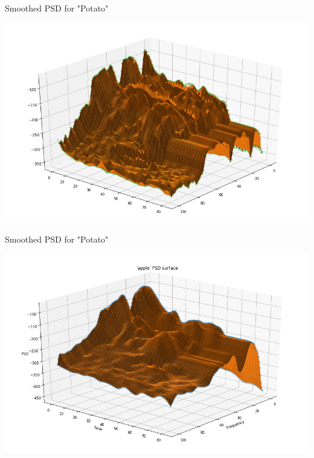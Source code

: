 \documentclass[14pt,aspectratio=169, serif, dvipsnames]{beamer}
\begin{document}
\begin{frame}{Smoothed PSD for "Potato"}
    \begin{center}
        \includegraphics[scale = 0.4]{pictures/potato_psd.png}
    \end{center}
\end{frame}

\begin{frame}{Smoothed PSD for "Potato"}
    \begin{center}
        \includegraphics[scale = 0.4]{pictures/smoother_potato.png}
    \end{center}
\end{frame}
\end{document}

